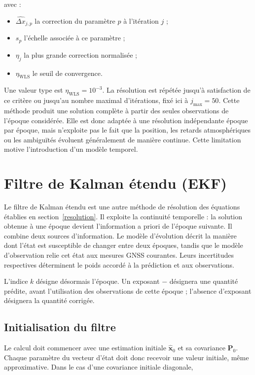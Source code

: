 avec :

\begin{itemize}
    \item $\widehat{\Delta x}_{j,p}$ la correction du paramètre $p$ à
    l'itération $j$ ;
    \item $s_p$ l'échelle associée à ce paramètre ;
    \item $\eta_j$ la plus grande correction normalisée ;
    \item $\eta_{\mathrm{WLS}}$ le seuil de convergence.
\end{itemize}

Une valeur type est $\eta_{\mathrm{WLS}}=10^{-3}$. La résolution est répétée
jusqu'à satisfaction de ce critère ou jusqu'au nombre maximal d'itérations,
fixé ici à $j_{\max}=50$. Cette méthode produit une
solution complète à partir des seules observations de l'époque considérée.
Elle est donc adaptée à une résolution indépendante époque par époque, mais
n'exploite pas le fait que la position, les retards atmosphériques ou les
ambiguïtés évoluent généralement de manière continue. Cette limitation motive
l'introduction d'un modèle temporel.

\section{Filtre de Kalman étendu (EKF)}
\label{Kalman}

Le filtre de Kalman étendu est une autre méthode de résolution des équations établies en section~\ref{resolution}.
Il exploite la continuité temporelle : la solution
obtenue à une époque devient l'information a priori de l'époque suivante. Il
combine deux sources d'information. Le modèle d'évolution décrit la manière
dont l'état est susceptible de changer entre deux époques, tandis que le modèle
d'observation relie cet état aux mesures GNSS courantes. Leurs incertitudes
respectives déterminent le poids accordé à la prédiction et aux observations.

L'indice $k$
désigne désormais l'époque. Un exposant $-$ désignera une quantité prédite,
avant l'utilisation des observations de cette époque ; l'absence d'exposant
désignera la quantité corrigée.

\subsection{Initialisation du filtre}
\label{sec:ekf_initialization}

Le calcul doit commencer avec une estimation initiale
$\widehat{\mathbf x}_0$ et sa covariance $\mathbf P_0$. Chaque paramètre du
vecteur d'état doit donc recevoir une valeur initiale, même approximative. Dans
le cas d'une covariance initiale diagonale,

